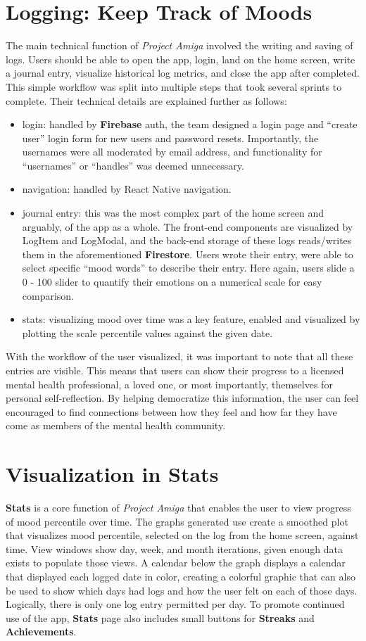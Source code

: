 \documentclass[10pt,american english]{article}
\begin{document}
\section*{Logging: Keep Track of Moods}
The main technical function of \textit{Project Amiga} involved the writing and saving of logs. Users should be able to open the app, login, land on the home screen, write a journal entry, visualize historical log metrics, and close the app after completed. This simple workflow was split into multiple steps that took several sprints to complete. Their technical details are explained further as follows:
\begin{itemize}
\item login: handled by \textbf{Firebase} auth, the team designed a login page and ``create user'' login form for new users and password resets. Importantly, the usernames were all moderated by email address, and functionality for ``usernames'' or ``handles'' was deemed unnecessary.
\item navigation: handled by React Native navigation.
\item journal entry: this was the most complex part of the home screen and arguably, of the app as a whole. The front-end components are visualized by LogItem and LogModal, and the back-end storage of these logs reads/writes them in the aforementioned \textbf{Firestore}. Users wrote their entry, were able to select specific ``mood words'' to describe their entry. Here again, users slide a 0 - 100 slider to quantify their emotions on a numerical scale for easy comparison. 
\item stats: visualizing mood over time was a key feature, enabled and visualized by plotting the scale percentile values against the given date.
\end{itemize}
With the workflow of the user visualized, it was important to note that all these entries are visible. This means that users can show their progress to a licensed mental health professional, a loved one, or most importantly, themselves for personal self-reflection. By helping democratize this information, the user can feel encouraged to find connections between how they feel and how far they have come as members of the mental health community.

\section*{Visualization in Stats}
\textbf{Stats} is a core function of \textit{Project Amiga} that enables the user to view progress of mood percentile over time. The graphs generated use create a smoothed plot that visualizes mood percentile, selected on the log from the home screen, against time. View windows show day, week, and month iterations, given enough data exists to populate those views. A calendar below the graph displays a calendar that displayed each logged date in color, creating a colorful graphic that can also be used to show which days had logs and how the user felt on each of those days. Logically, there is only one log entry permitted per day. To promote continued use of the app, \textbf{Stats} page also includes small buttons for \textbf{Streaks} and \textbf{Achievements}.
\end{document}
